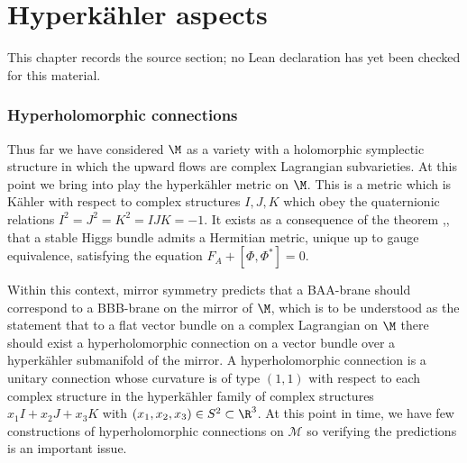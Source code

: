 \chapter{Hyperk\"ahler aspects}
\label{very-stable-higgs-bundles-equivariant-multiplicity-mirror-symmetry-chapter-07}

\begin{remark}
\label{very-stable-higgs-bundles-equivariant-multiplicity-mirror-symmetry-chapter-07-source}
This chapter records the source section; no Lean declaration has yet been checked for this material.
\notready
\end{remark}

\label{hyper}



\subsection{Hyperholomorphic connections}

Thus far we have considered $\M$ as a variety with a holomorphic symplectic structure in which the upward flows are complex Lagrangian subvarieties. At this point we bring into play the hyperk\"ahler metric on $\M$. This is a metric which is K\"ahler with respect to complex structures $I,J,K$ which obey the quaternionic relations $I^2=J^2=K^2=IJK=-1$. It exists as a consequence of the theorem \cite{hitchin},\cite{simpson1},\cite{simpson1b} that a stable Higgs bundle admits a Hermitian metric, unique up to gauge equivalence, satisfying the equation $F_A+[\Phi,\Phi^*]=0$.

Within this context, mirror symmetry predicts that a BAA-brane should correspond to a BBB-brane on the mirror of $\M$, which is to be understood as the statement that to a flat vector bundle on a complex Lagrangian on $\M$ there should exist a hyperholomorphic connection on a vector bundle over a hyperk\"ahler submanifold of the mirror.  A hyperholomorphic connection is a unitary connection whose curvature is of type $(1,1)$ with respect to each complex structure in the hyperk\"ahler family  of complex structures $x_1I+x_2J+x_3K$ with   $(x_1,x_2,x_3)\in S^2\subset \R^3$.  At this point in time, we have few constructions of hyperholomorphic connections on ${\mathcal M}$ so verifying the predictions is an important issue.

